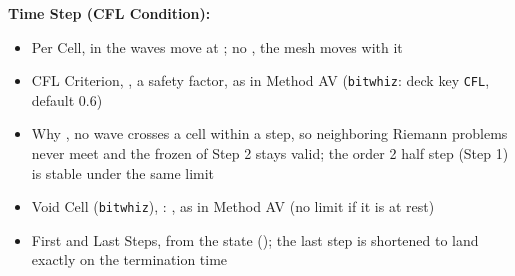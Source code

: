 \documentclass[11pt,addpoints]{exam}
\begin{document}
\begin{tcolorbox}[breakable]
\textbf{Time Step (CFL Condition):}\vspace{.5em}
\begin{itemize}
\item Per Cell, \hspace{3mm}  \hspace{7mm} in  the waves move at ; no , the mesh moves with it\vspace{.5em}
\item CFL Criterion, \hspace{3mm} , \hspace{2mm}  \hspace{7mm} a safety factor, as in Method AV (\texttt{bitwhiz}: deck key \texttt{CFL}, default 0.6)\vspace{.5em}
\item Why , \hspace{3mm} no wave crosses a cell within a step, so neighboring Riemann problems never meet and the frozen  of Step 2 stays valid; the order 2 half step (Step 1) is stable under the same limit\vspace{.5em}
\item Void Cell (\texttt{bitwhiz}), \hspace{3mm} : \hspace{2mm} , as in Method AV (no limit if it is at rest)\vspace{.5em}
\item First and Last Steps, \hspace{3mm}  from the  state (); \hspace{2mm} the last step is shortened to land exactly on the termination time
\end{itemize}
\end{tcolorbox}

\;\\
\end{document}
